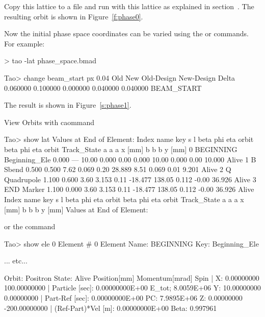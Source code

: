 \documentclass{hitec}
\begin{document}
Copy this lattice to a file and run \tao with this lattice as explained in
section~. The resulting orbit is shown in Figure~\ref{f:phase0}.


Now the initial phase space coordinates can be varied using the  or 
commands. For example:
\begin{code}
> tao -lat phase_space.bmad

Tao> change beam_start px 0.04
           Old           New    Old-Design    New-Design         Delta
      0.060000      0.100000      0.000000      0.040000      0.040000    BEAM_START
\end{code}

The result is shown in Figure~\ref{s:phase1}.

View Orbits with  caommand

\begin{code}
Tao> show lat
      Values at End of Element:
 Index  name      key                       s       l    beta     phi    eta  orbit     beta     phi    eta  orbit    Track_State
                                                            a       a      a  x [mm]       b       b      b  y [mm]
     0  BEGINNING Beginning_Ele         0.000     ---   10.00   0.000   0.00   0.000   10.00   0.000   0.00  10.000   Alive
     1  B         Sbend                 0.500   0.500    7.62   0.069   0.20  28.889    8.51   0.069   0.01   9.201   Alive
     2  Q         Quadrupole            1.100   0.600    3.60   3.153   0.11 -18.477  138.05   0.112  -0.00  36.926   Alive
     3  END       Marker                1.100   0.000    3.60   3.153   0.11 -18.477  138.05   0.112  -0.00  36.926   Alive
 Index  name      key                       s       l    beta     phi    eta  orbit     beta     phi    eta  orbit    Track_State
                                                            a       a      a  x [mm]       b       b      b  y [mm]
      Values at End of Element:
\end{code}

or the  command

\begin{code}
Tao> show ele 0
 Element #                0
 Element Name: BEGINNING
 Key: Beginning_Ele

... etc...

Orbit:  Positron   State: Alive
         Position[mm] Momentum[mrad]        Spin   |
  X:       0.00000000   100.00000000               | Particle [sec]:      0.00000000E+00  E_tot;  8.0059E+06
  Y:      10.00000000     0.00000000               | Part-Ref [sec]:      0.00000000E+00  PC:     7.9895E+06
  Z:       0.00000000  -200.00000000               | (Ref-Part)*Vel [m]:  0.00000000E+00  Beta:    0.997961
\end{code}
\end{document}
